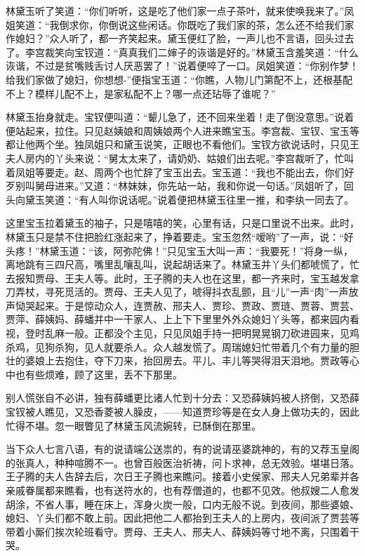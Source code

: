 \documentclass[12pt,oneside]{book}
\begin{document}
林黛玉听了笑道：“你们听听，这是吃了他们家一点子茶叶，就来使唤我来了。”凤姐笑道：“我倒求你，你倒说这些闲话。你既吃了我们家的茶，怎么还不给我们家作媳妇？”众人听了，都一齐笑起来。黛玉便红了脸，一声儿也不言语，回头过去了。李宫裁笑向宝钗道：“真真我们二婶子的诙谐是好的。”林黛玉含羞笑道：“什么诙谐，不过是贫嘴贱舌讨人厌恶罢了！”说着便啐了一口。凤姐笑道：“你别作梦！给我们家做了媳妇，你想想-”便指宝玉道：“你瞧，人物儿门第配不上，还根基配不上？模样儿配不上，是家私配不上？哪一点还玷辱了谁呢？”

林黛玉抬身就走。宝钗便叫道：“颦儿急了，还不回来坐着！走了倒没意思。”说着便站起来，拉住。只见赵姨娘和周姨娘两个人进来瞧宝玉。李宫裁、宝钗、宝玉等都让他两个坐。独凤姐只和黛玉说笑，正眼也不看他们。宝钗方欲说话时，只见王夫人房内的丫头来说：“舅太太来了，请奶奶、姑娘们出去呢。”李宫裁听了，忙叫着凤姐等要走。赵、周两个也忙辞了宝玉出去。宝玉道：“我也不能出去，你们好歹别叫舅母进来。”又道：“林妹妹，你先站一站，我和你说一句话。”凤姐听了，回头向黛玉笑道：“有人叫你说话呢。”说着便把林黛玉往里一推，和李纨一同去了。

这里宝玉拉着黛玉的袖子，只是嘻嘻的笑，心里有话，只是口里说不出来。此时，林黛玉只是禁不住把脸红涨起来了，挣着要走。宝玉忽然“嗳哟”了一声，说：“好头疼！”林黛玉道：“该，阿弥陀佛！”只见宝玉大叫一声：“我要死！”将身一纵，离地跳有三四尺高，嘴里乱嚷乱叫，说起胡话来了。林黛玉并丫头们都唬慌了，忙去报知贾母、王夫人等。此时，王子腾的夫人也在这里，都一齐来时，宝玉越发拿刀弄杖，寻死觅活的。贾母、王夫人见了，唬得抖衣乱颤，且“儿”一声“肉”一声放声恸哭起来。于是惊动众人，连贾赦、邢夫人、贾珍、贾政、贾琏、贾蓉、贾芸、贾萍、薛姨妈、薛蟠并中一干家人、上上下下里里外外众媳妇丫头等，都来园内看视，登时乱麻一般。正都没个主见，只见凤姐手持一把明晃晃钢刀砍进园来，见鸡杀鸡，见狗杀狗，见人就要杀人。众人越发慌了。周瑞媳妇忙带着几个有力量的胆壮的婆娘上去抱住，夺下刀来，抬回房去。平儿、丰儿等哭得泪天泪地。贾政等心中也有些烦难，顾了这里，丢不下那里。

别人慌张自不必讲，独有薛蟠更比诸人忙到十分去：又恐薛姨妈被人挤倒，又恐薛宝钗被人瞧见，又恐香菱被人臊皮，——知道贾珍等是在女人身上做功夫的，因此忙得不堪。忽一眼瞥见了林黛玉风流婉转，已酥倒在那里。

当下众人七言八语，有的说请端公送祟的，有的说请巫婆跳神的，有的又荐玉皇阁的张真人，种种喧腾不一。也曾百般医治祈祷，问卜求神，总无效验。堪堪日落。王子腾的夫人告辞去后，次日王子腾也来瞧问。接着小史侯家、邢夫人兄弟辈并各亲戚眷属都来瞧看，也有送符水的，也有荐僧道的，也都不见效。他叔嫂二人愈发胡涂，不省人事，睡在床上，浑身火炭一般，口内无般不说。到夜间，那些婆娘、媳妇、丫头们都不敢上前。因此把他二人都抬到王夫人的上房内，夜间派了贾芸等带着小厮们挨次轮班看守。贾母、王夫人、邢夫人、薛姨妈等寸地不离，只围着干哭。
\end{document}
